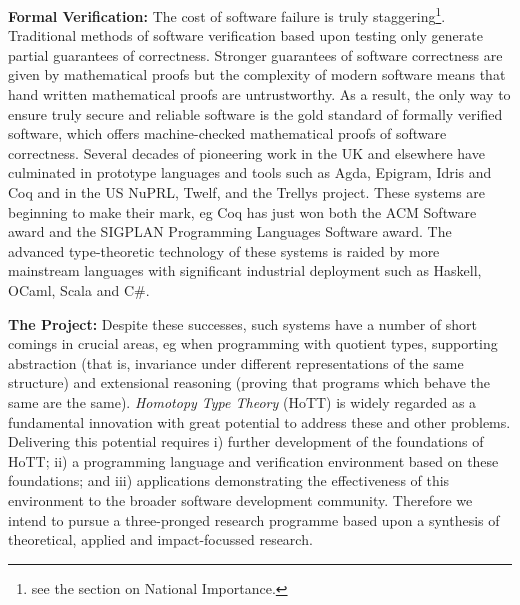 \documentclass[a4paper,11pt]{article}
\begin{document}
{\bf Formal Verification:} The cost of software failure is truly
staggering\footnote{see the section on National
  Importance.}. Traditional methods of software verification based
upon testing only generate partial guarantees of correctness. Stronger
guarantees of software correctness are given by mathematical proofs
but the complexity of modern software means that hand written
mathematical proofs are untrustworthy. As a result, the only way to
ensure truly secure and reliable software is the gold standard of
formally verified software, which offers machine-checked mathematical
proofs of software correctness. Several decades of pioneering work in
the UK and elsewhere have culminated in prototype languages and tools
such as Agda, Epigram, Idris and Coq and in the US NuPRL, Twelf, and
the Trellys project. These systems are beginning to make their mark,
eg Coq has just won both the ACM Software award and the SIGPLAN
Programming Languages Software award.
The advanced
type-theoretic technology of these systems is raided by more
mainstream languages with significant industrial deployment such as
Haskell, OCaml, Scala and C\#.

{\bf The Project:} Despite these successes, such systems have a number
of short comings in crucial areas, eg when programming with quotient
types, supporting abstraction (that is, invariance under different
representations of the same structure) and extensional reasoning
(proving that programs which behave the same are the same).  {\em
  Homotopy Type Theory} (HoTT) is widely regarded as a fundamental
innovation with great potential to address these and other problems.
Delivering this potential requires i) further
development of the foundations of HoTT; ii)
a programming language and verification environment based on
these foundations; and iii) applications demonstrating the effectiveness
of this environment to the broader software development community.
Therefore we intend to pursue a three-pronged
research programme based upon a synthesis of theoretical, applied and
impact-focussed research.


\end{document}
